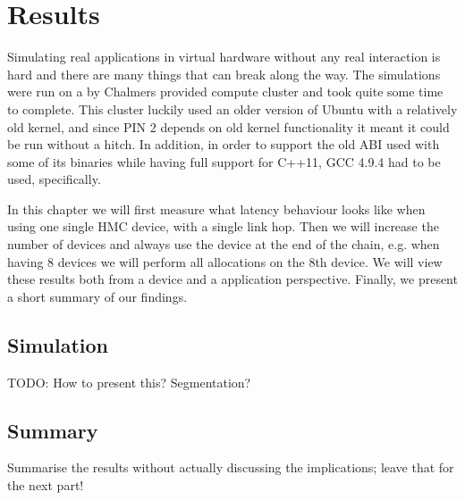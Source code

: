 \chapter{Results}
Simulating real applications in virtual hardware without any real interaction is hard and there are many things that can break along the way. The simulations were run on a by Chalmers provided compute cluster and took quite some time to complete. This cluster luckily used an older version of Ubuntu with a relatively old kernel, and since PIN 2 depends on old kernel functionality it meant it could be run without a hitch. In addition, in order to support the old ABI used with some of its binaries while having full support for C++11, GCC 4.9.4 had to be used, specifically. 
\bigskip

In this chapter we will first measure what latency behaviour looks like when using one single HMC device, with a single link hop. Then we will increase the number of devices and always use the device at the end of the chain, e.g. when having 8 devices we will perform all allocations on the 8th device. We will view these results both from a device and a application perspective. Finally, we present a short summary of our findings.

\section{Simulation}
TODO: How to present this? Segmentation?

\section{Summary}
Summarise the results without actually discussing the implications; leave that for the next part!